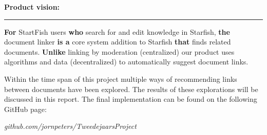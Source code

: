 \begin{shaded}
\textbf{{\large Product vision:}} \vspace{0.4\baselineskip} \hrule 
\vspace{1em}
{\large
\begin{spacing}{1.5}
	{\bf For} StartFish users {\bf who} search for and edit knowledge in Starfish,
	{\bf the} document linker {\bf is a} core system addition to Starfish
	{\bf that} finds related documents. {\bf Unlike} linking by moderation (centralized) our product uses algorithms and data (decentralized) to automatically suggest document links.
\end{spacing}
}
\end{shaded}


Within the time span of this project multiple ways of recommending links between documents have been explored. The results of these explorations will be discussed in this report. The final implementation can be found on the following GitHub page:
\begin{center}
 \emph{github.com/jornpeters/TweedejaarsProject}
\end{center}
